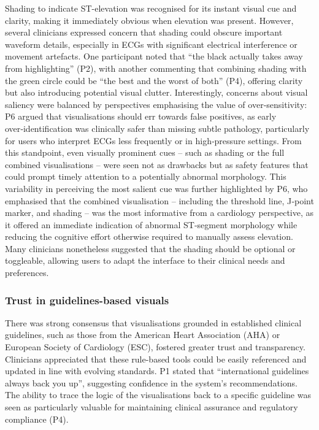 \documentclass[
  10pt,
  letterpaper,
]{article}
\newcounter{none} %
\begin{document}
Shading to indicate ST-elevation was recognised for its instant visual
cue and clarity, making it immediately obvious when elevation was
present. However, several clinicians expressed concern that shading
could obscure important waveform details, especially in ECGs with
significant electrical interference or movement artefacts. One
participant noted that ``the black actually takes away from
highlighting'' (P2), with another commenting that combining shading with
the green circle could be ``the best and the worst of both'' (P4),
offering clarity but also introducing potential visual clutter.
Interestingly, concerns about visual saliency were balanced by
perspectives emphasising the value of over‑sensitivity: P6 argued that
visualisations should err towards false positives, as early
over‑identification was clinically safer than missing subtle pathology,
particularly for users who interpret ECGs less frequently or in
high‑pressure settings. From this standpoint, even visually prominent
cues -- such as shading or the full combined visualisations -- were seen
not as drawbacks but as safety features that could prompt timely
attention to a potentially abnormal morphology. This variability in
perceiving the most salient cue was further highlighted by P6, who
emphasised that the combined visualisation -- including the threshold
line, J‑point marker, and shading -- was the most informative from a
cardiology perspective, as it offered an immediate indication of
abnormal ST‑segment morphology while reducing the cognitive effort
otherwise required to manually assess elevation. Many clinicians
nonetheless suggested that the shading should be optional or toggleable,
allowing users to adapt the interface to their clinical needs and
preferences.

\subsubsection{Trust in guidelines-based
visuals}\label{trust-in-guidelines-based-visuals}

There was strong consensus that visualisations grounded in established
clinical guidelines, such as those from the American Heart Association
(AHA) or European Society of Cardiology (ESC), fostered greater trust
and transparency. Clinicians appreciated that these rule-based tools
could be easily referenced and updated in line with evolving standards.
P1 stated that ``international guidelines always back you up'',
suggesting confidence in the system's recommendations. The ability to
trace the logic of the visualisations back to a specific guideline was
seen as particularly valuable for maintaining clinical assurance and
regulatory compliance (P4).
\end{document}
